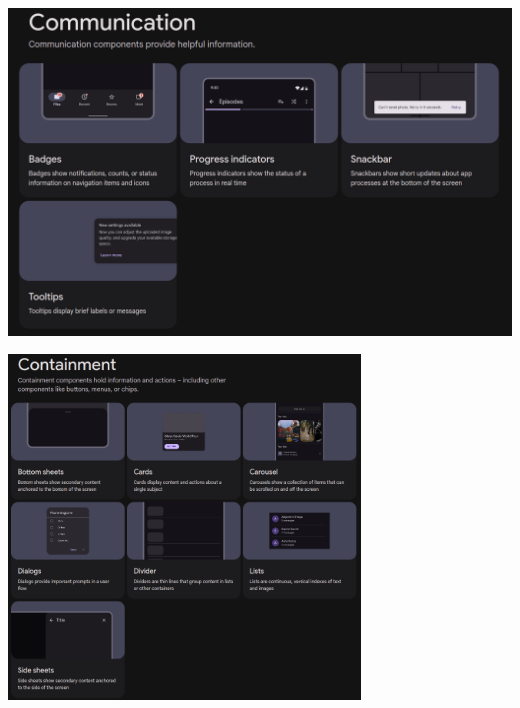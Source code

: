 \documentclass[12pt]{beamer}
\begin{document}
    \begin{frame}
        \includegraphics[width=1\textwidth]{communication.png}
    \end{frame}

    \begin{frame}
        \begin{center}
            \includegraphics[width=0.7\textwidth]{containment.png}
        \end{center}
    \end{frame}
\end{document}
